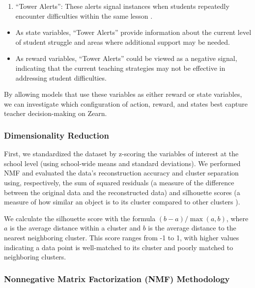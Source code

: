 \documentclass[
  number,
  preprint,
  3p,
  onecolumn]{elsarticle}
\providecommand{\tightlist}{%
  \setlength{\itemsep}{0pt}\setlength{\parskip}{0pt}}\usepackage{longtable,booktabs,array}
\begin{document}
\begin{enumerate}
\def\labelenumi{\arabic{enumi}.}
\setcounter{enumi}{4}
\tightlist
\item
  ``Tower Alerts'': These alerts signal instances when students
  repeatedly encounter difficulties within the same lesson
  \citep{zearn2024b}.
\end{enumerate}

\begin{itemize}
\tightlist
\item
  As state variables, ``Tower Alerts'' provide information about the
  current level of student struggle and areas where additional support
  may be needed.
\item
  As reward variables, ``Tower Alerts'' could be viewed as a negative
  signal, indicating that the current teaching strategies may not be
  effective in addressing student difficulties.
\end{itemize}

By allowing models that use these variables as either reward or state
variables, we can investigate which configuration of action, reward, and
states best capture teacher decision-making on Zearn.

\subsubsection{Dimensionality
Reduction}\label{dimensionality-reduction-1}

First, we standardized the dataset by z-scoring the variables of
interest at the school level (using school-wide means and standard
deviations). We performed NMF and evaluated the data's reconstruction
accuracy and cluster separation using, respectively, the sum of squared
residuals (a measure of the difference between the original data and the
reconstructed data) and silhouette scores (a measure of how similar an
object is to its cluster compared to other clusters
\citep{rousseeuw1987}).

We calculate the silhouette score with the formula
\((b - a) / \max(a, b)\), where \(a\) is the average distance within a
cluster and \(b\) is the average distance to the nearest neighboring
cluster. This score ranges from -1 to 1, with higher values indicating a
data point is well-matched to its cluster and poorly matched to
neighboring clusters.

\subsubsection{Nonnegative Matrix Factorization (NMF)
Methodology}\label{nonnegative-matrix-factorization-nmf-methodology}
\end{document}
